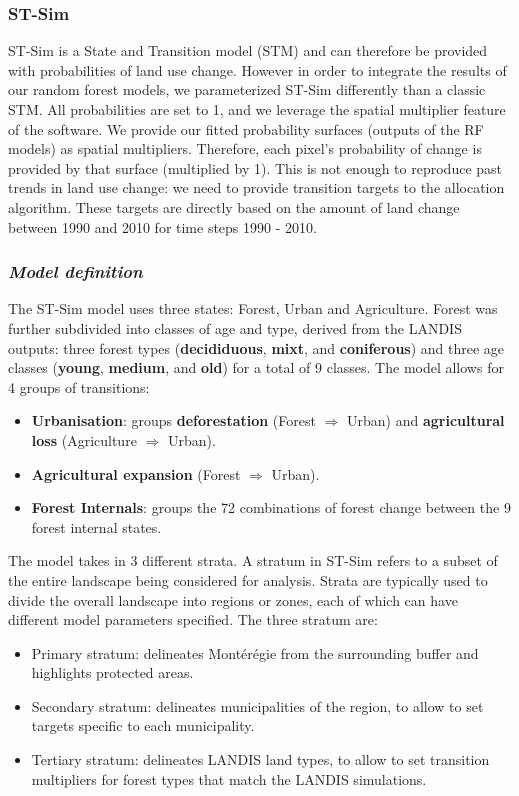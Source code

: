 \subsubsection*{ST-Sim}

ST-Sim \citep{daniel_state-and-transition_2016}  is a State and Transition model (STM) and can therefore be provided with probabilities of land use change. However in order to integrate the results of our random forest models, we parameterized ST-Sim differently than a classic STM. All probabilities are set to 1, and we leverage the spatial multiplier feature of the software. We provide our fitted probability surfaces (outputs of the RF models) as spatial multipliers. Therefore, each pixel's probability of change is provided by that surface (multiplied by 1).  This is not enough to reproduce past trends in land use change: we need to provide transition targets to the allocation algorithm. These targets are directly based on the amount of land change between 1990 and 2010 for time steps 1990 - 2010.\\

\subsubsection*{\textit{Model definition}}

The ST-Sim model uses three states: Forest, Urban and Agriculture. Forest was further subdivided into classes of age and type, derived from the LANDIS outputs: three forest types (\textbf{decididuous}, \textbf{mixt}, and \textbf{coniferous}) and three age classes (\textbf{young}, \textbf{medium}, and \textbf{old}) for a total of 9 classes.
The model allows for 4 groups of transitions:
\begin{itemize}
\item{\textbf{Urbanisation}}: groups \textbf{deforestation} (Forest $\Rightarrow$ Urban) and \textbf{agricultural loss} (Agriculture $\Rightarrow$ Urban).
\item{\textbf{Agricultural expansion}} (Forest $\Rightarrow$ Urban).
\item{\textbf{Forest Internals}}: groups the 72 combinations of forest change between the 9 forest internal states.
\end{itemize}
The model takes in 3 different strata. A stratum in ST-Sim refers to a subset of the entire landscape being considered for analysis. Strata are typically used to divide the overall landscape into regions or zones, each of which can have different model parameters specified. The three stratum are:
\begin{itemize}
\item{Primary stratum:} delineates Montérégie from the  surrounding buffer and highlights protected areas.
\item{Secondary stratum:} delineates municipalities of the region, to allow to set targets specific to each municipality.
\item{Tertiary stratum:} delineates LANDIS land types, to allow to set transition multipliers for forest types that match the LANDIS simulations. \\
\end{itemize}

